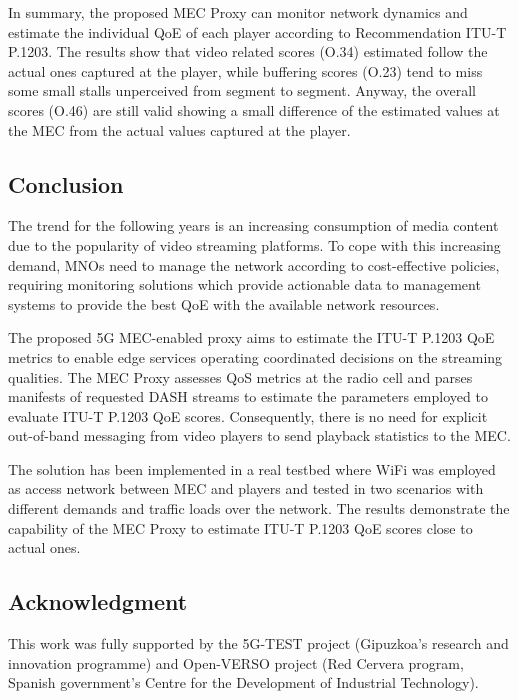 In summary, the proposed MEC Proxy can monitor network dynamics and estimate the individual QoE of each player according to Recommendation ITU-T P.1203. The results show that video related scores (O.34) estimated follow the actual ones captured at the player, while buffering scores (O.23) tend to miss some small stalls unperceived from segment to segment. Anyway, the overall scores (O.46) are still valid showing a small difference of the estimated values at the MEC from the actual values captured at the player.

\subsection{Conclusion}
\label{sec:MTAP20205}

The trend for the following years is an increasing consumption of media content due to the popularity of video streaming platforms. To cope with this increasing demand, MNOs need to manage the network according to cost-effective policies, requiring monitoring solutions which provide actionable data to management systems to provide the best QoE with the available network resources.

The proposed 5G MEC-enabled proxy aims to estimate the ITU-T P.1203 QoE metrics to enable edge services operating coordinated decisions on the streaming qualities. The MEC Proxy assesses QoS metrics at the radio cell and parses manifests of requested DASH streams to estimate the parameters employed to evaluate ITU-T P.1203 QoE scores. Consequently, there is no need for explicit out-of-band messaging from video players to send playback statistics to the MEC.

The solution has been implemented in a real testbed where WiFi was employed as access network between MEC and players and tested in two scenarios with different demands and traffic loads over the network. The results demonstrate the capability of the MEC Proxy to estimate ITU-T P.1203 QoE scores close to actual ones.

\subsection*{Acknowledgment}
This work was fully supported by the 5G-TEST project (Gipuzkoa's research and innovation programme) and Open-VERSO project (Red Cervera program, Spanish government's Centre for the Development of Industrial Technology).
		

